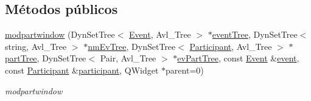 \subsection*{Métodos públicos}
\begin{DoxyCompactItemize}
\item 
\hyperlink{classmodpartwindow_a1f50ef5614f3dcc4a31f18db43eb42db}{modpartwindow} (Dyn\+Set\+Tree$<$ \hyperlink{class_event}{Event}, Avl\+\_\+\+Tree $>$ $\ast$\hyperlink{classmodpartwindow_abe591df07342ab62a7a75423c9ff2459}{event\+Tree}, Dyn\+Set\+Tree$<$ string, Avl\+\_\+\+Tree $>$ $\ast$\hyperlink{classmodpartwindow_af57197e9e234588a272d3f952c995218}{nm\+Ev\+Tree}, Dyn\+Set\+Tree$<$ \hyperlink{class_participant}{Participant}, Avl\+\_\+\+Tree $>$ $\ast$\hyperlink{classmodpartwindow_a9a8b7a340fdb84fa6ef04425642c90ec}{part\+Tree}, Dyn\+Set\+Tree$<$ Pair, Avl\+\_\+\+Tree $>$ $\ast$\hyperlink{classmodpartwindow_a3d2ffe89336e8e883e192e6cb39997d9}{ev\+Part\+Tree}, const \hyperlink{class_event}{Event} \&\hyperlink{classmodpartwindow_aac7d760729cfe50b80229911313c0d69}{event}, const \hyperlink{class_participant}{Participant} \&\hyperlink{classmodpartwindow_a52f8b015c48419a094701e1c4ad30b0c}{participant}, Q\+Widget $\ast$parent=0)
\begin{DoxyCompactList}\small\item\em modpartwindow \end{DoxyCompactList}\end{DoxyCompactItemize}
